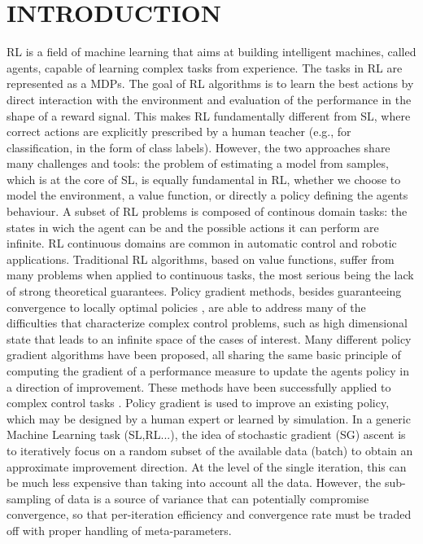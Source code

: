 
\chapter{INTRODUCTION} \label{chap:aChapter}

\ac{RL} is a field of machine learning that aims at building intelligent machines, called agents, capable of learning complex tasks from experience.
The tasks in \acs{RL} are represented as a \acs{MDP}s. 
The goal of \acs{RL} \citep{sutton1998reinforcement} algorithms is to learn the best actions by direct interaction with the environment and evaluation of the performance in the shape of a reward signal.
This makes \acs{RL} fundamentally different from \ac{SL}, where correct actions are explicitly prescribed by a human teacher (e.g., for classification, in the form of class labels).
However, the two approaches share many challenges and tools: the problem of estimating a model from samples, which is at the core of \acs{SL}, is equally fundamental in \acs{RL}, whether we choose to model the environment, a value function, or directly a policy defining the agent\textquotesingle s behaviour.
A subset of \acs{RL} problems is composed of continous domain tasks: the states in wich the agent can be and the possible actions it can perform are infinite.
\acs{RL} continuous domains are common in automatic control and robotic applications. Traditional \acs{RL} algorithms, based on value functions, suffer from many problems when applied to continuous tasks, the most serious being the lack of strong theoretical guarantees. Policy gradient methods, besides guaranteeing convergence to locally optimal policies \citep{sutton2000policy}, are able to address many of the difficulties that characterize complex control problems, such as high dimensional state that leads to an infinite space of the cases of interest. 
Many different policy gradient algorithms have been proposed, all sharing the same basic principle of computing the gradient of a performance measure to update the agent\textquotesingle s policy in a direction of improvement. These methods have been successfully applied to complex control tasks \citep{deisenroth2013survey}. Policy gradient is used to improve an existing policy, which may be designed by a human expert or learned by simulation.\newline
In a generic Machine Learning task (\acs{SL},\acs{RL}...), the idea of stochastic gradient (\acs{SG}) ascent \citep{nesterov2013introductory} is to iteratively focus on a random subset of the available data (batch) to obtain an approximate improvement direction. At the level of the single iteration, this can be much less expensive than taking into account all the data.
However, the sub-sampling of data is a source of variance that can potentially compromise convergence, so that per-iteration efficiency and convergence rate must be traded off with proper handling of meta-parameters. 

